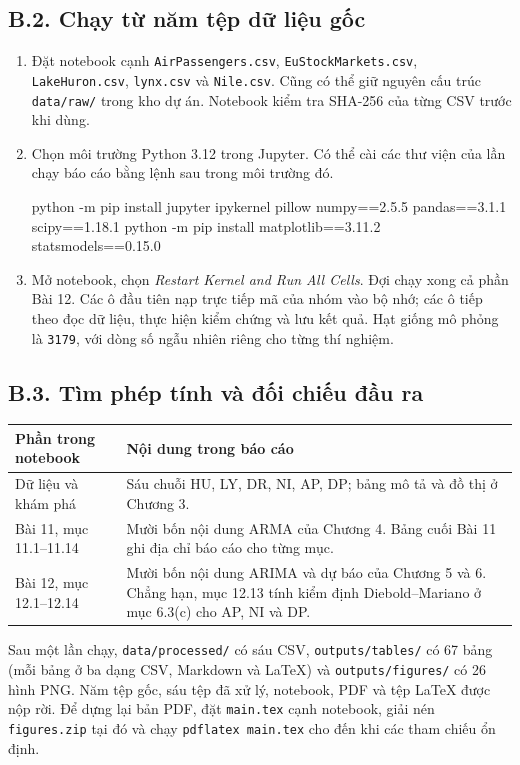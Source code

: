\subsection*{B.2. Chạy từ năm tệp dữ liệu gốc}

\begin{enumerate}
\item Đặt notebook cạnh \texttt{AirPassengers.csv}, \texttt{EuStockMarkets.csv}, \texttt{LakeHuron.csv}, \texttt{lynx.csv} và \texttt{Nile.csv}. Cũng có thể giữ nguyên cấu trúc \texttt{data/raw/} trong kho dự án. Notebook kiểm tra SHA-256 của từng CSV trước khi dùng.
\item Chọn môi trường Python 3.12 trong Jupyter. Có thể cài các thư viện của lần chạy báo cáo bằng lệnh sau trong môi trường đó.
\begin{codeblock}
python -m pip install jupyter ipykernel pillow numpy==2.5.5 pandas==3.1.1 scipy==1.18.1
python -m pip install matplotlib==3.11.2 statsmodels==0.15.0
\end{codeblock}
\item Mở notebook, chọn \textit{Restart Kernel and Run All Cells}. Đợi chạy xong cả phần Bài 12. Các ô đầu tiên nạp trực tiếp mã của nhóm vào bộ nhớ; các ô tiếp theo đọc dữ liệu, thực hiện kiểm chứng và lưu kết quả. Hạt giống mô phỏng là \texttt{3179}, với dòng số ngẫu nhiên riêng cho từng thí nghiệm.
\end{enumerate}

\subsection*{B.3. Tìm phép tính và đối chiếu đầu ra}

\noindent\begin{tabularx}{\linewidth}{@{}p{4.0cm}X@{}}
\toprule
Phần trong notebook & Nội dung trong báo cáo \\
\midrule
Dữ liệu và khám phá & Sáu chuỗi HU, LY, DR, NI, AP, DP; bảng mô tả và đồ thị ở Chương 3. \\
Bài 11, mục 11.1--11.14 & Mười bốn nội dung ARMA của Chương 4. Bảng cuối Bài 11 ghi địa chỉ báo cáo cho từng mục. \\
Bài 12, mục 12.1--12.14 & Mười bốn nội dung ARIMA và dự báo của Chương 5 và 6. Chẳng hạn, mục 12.13 tính kiểm định Diebold--Mariano ở mục 6.3(c) cho AP, NI và DP. \\
\bottomrule
\end{tabularx}

Sau một lần chạy, \texttt{data/processed/} có sáu CSV, \texttt{outputs/tables/} có 67 bảng (mỗi bảng ở ba dạng CSV, Markdown và LaTeX) và \texttt{outputs/figures/} có 26 hình PNG. Năm tệp gốc, sáu tệp đã xử lý, notebook, PDF và tệp LaTeX được nộp rời. Để dựng lại bản PDF, đặt \texttt{main.tex} cạnh notebook, giải nén \texttt{figures.zip} tại đó và chạy \texttt{pdflatex main.tex} cho đến khi các tham chiếu ổn định.
